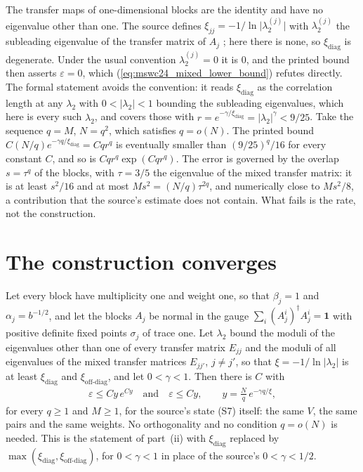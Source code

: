 \documentclass{article}
\begin{document}
The transfer maps of one-dimensional blocks are the identity and have no
eigenvalue other than one. The source defines
$\xi_{jj}=-1/\ln\lvert\lambda_2^{(j)}\rvert$ with $\lambda_2^{(j)}$ the subleading
eigenvalue of the transfer matrix of $A_j$ \cite{Malz2024Preparation}; here there
is none, so $\xi_{\mathrm{diag}}$ is degenerate. Under the usual convention
$\lambda_2^{(j)}=0$ it is $0$, and the printed bound then asserts $\varepsilon=0$,
which (\ref{eq:mswc24_mixed_lower_bound}) refutes directly. The formal statement
avoids the convention: it reads $\xi_{\mathrm{diag}}$ as the correlation length at any
$\lambda_2$ with $0<\lvert\lambda_2\rvert<1$ bounding the subleading eigenvalues,
which here is every such $\lambda_2$, and covers those with
$r=e^{-\gamma/\xi_{\mathrm{diag}}}=\lvert\lambda_2\rvert^\gamma<9/25$. Take the
sequence $q=M$, $N=q^2$, which satisfies $q=o(N)$.
The printed bound $C(N/q)e^{-\gamma q/\xi_{\mathrm{diag}}}=Cqr^q$ is eventually
smaller than $(9/25)^q/16$ for every constant $C$, and so is
$Cqr^q\exp(Cqr^q)$. The error is governed by the overlap $s=\tau^q$ of the blocks,
with $\tau=3/5$ the eigenvalue of the mixed transfer matrix: it is at least $s^2/16$
and at most $Ms^2=(N/q)\tau^{2q}$, and numerically close to $Ms^2/8$, a contribution
that the source's estimate does not contain. What fails is the rate, not the
construction.

\section{The construction converges}
Let every block have multiplicity one and weight one, so that $\beta_j=1$ and
$\alpha_j=b^{-1/2}$, and let the blocks $A_j$ be normal in the gauge
$\sum_i(A_j^i)^\dagger A_j^i=\mathbf 1$ with positive definite fixed points
$\sigma_j$ of trace one. Let $\lambda_2$ bound the moduli of the eigenvalues other than
one of every transfer matrix $E_{jj}$ and the moduli of all eigenvalues of the mixed
transfer matrices $E_{jj'}$, $j\neq j'$, so that $\xi=-1/\ln\lvert\lambda_2\rvert$ is at
least $\xi_{\mathrm{diag}}$ and $\xi_{\mathrm{off\text{-}diag}}$, and let $0<\gamma<1$.
Then there is $C$ with
\begin{align}
    \varepsilon\leq Cy\,e^{Cy}\quad\text{and}\quad\varepsilon\leq Cy,\qquad
    y=\frac Nq\,e^{-\gamma q/\xi},
    \label{eq:mswc24_mixed_corrected}
\end{align}
for every $q\geq1$ and $M\geq1$, for the source's state (S7) itself: the same $V$, the
same pairs and the same weights. No orthogonality and no condition $q=o(N)$ is needed.
This is the statement of part~(ii) with $\xi_{\mathrm{diag}}$ replaced by
$\max(\xi_{\mathrm{diag}},\xi_{\mathrm{off\text{-}diag}})$, for $0<\gamma<1$ in place of the
source's $0<\gamma<1/2$.
\end{document}

